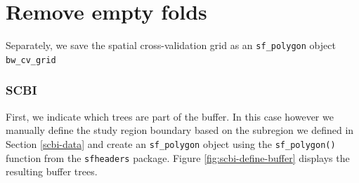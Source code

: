 \documentclass[12pt]{article}
\newenvironment{Shaded}{\begin{snugshade}}{\end{snugshade}}
\newcommand{\DataTypeTok}[1]{\textcolor[rgb]{0.13,0.29,0.53}{#1}}
\newcommand{\DecValTok}[1]{\textcolor[rgb]{0.00,0.00,0.81}{#1}}
\newcommand{\KeywordTok}[1]{\textcolor[rgb]{0.13,0.29,0.53}{\textbf{#1}}}
\newcommand{\NormalTok}[1]{#1}
\newcommand{\OperatorTok}[1]{\textcolor[rgb]{0.81,0.36,0.00}{\textbf{#1}}}
\newcommand{\StringTok}[1]{\textcolor[rgb]{0.31,0.60,0.02}{#1}}
\begin{document}
\hypertarget{remove-empty-folds}{%
\section{Remove empty folds}\label{remove-empty-folds}}

\begin{Shaded}
\end{Shaded}

Separately, we save the spatial cross-validation grid as an
\texttt{sf\_polygon} object \texttt{bw\_cv\_grid}

\begin{Shaded}
\end{Shaded}

\hypertarget{scbi-1}{%
\subsubsection{SCBI}\label{scbi-1}}

First, we indicate which trees are part of the buffer. In this case
however we manually define the study region boundary based on the
subregion we defined in Section \ref{scbi-data} and create an
\texttt{sf\_polygon} object using the \texttt{sf\_polygon()} function
from the \texttt{sfheaders} package. Figure \ref{fig:scbi-define-buffer}
displays the resulting buffer trees.
\end{document}
